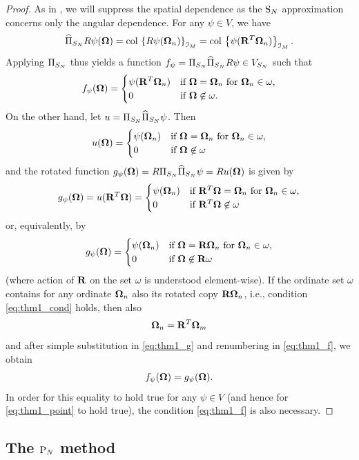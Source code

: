 \begin{proof}
As in , we will suppress the spatial dependence as the $\text{S}_{N}$ approximation concerns only the angular
dependence. For any $\psi\in V$, we have
\begin{equation*}
	\widehat\Pi_{S_N} R\psi(\mathbf{\Omega}) = \operatorname{col\,}\left\{R\psi(\mathbf{\Omega}_n)\right\}_{\mathcal{I}_{M}} = \operatorname{col\,}\left\{\psi(\mathbf{R}^T\mathbf{\Omega}_n)\right\}_{\mathcal{I}_{M}}.
\end{equation*}
Applying $\Pi_{S_N}$ thus yields a function $f_\psi = \Pi_{S_N}\widehat\Pi_{S_N} R\psi \in V_{S_N}$ such that
\begin{equation}\label{eq:thm1_f}
f_\psi(\mathbf{\Omega}) = \begin{cases}\displaystyle \psi(\mathbf{R}^T\mathbf{\Omega}_n) & \mbox{if $\mathbf{\Omega} = \mathbf{\Omega}_n$ for $\mathbf{\Omega}_n\in\omega$},\\ 0 & \mbox{if $\mathbf{\Omega} \not
	\in \omega$.} \end{cases}
\end{equation}
On the other hand, let $u = \Pi_{S_N}\widehat\Pi_{S_N}\psi$. Then
$$
u(\mathbf{\Omega}) = \begin{cases}\displaystyle \psi(\mathbf{\Omega}_n) & \mbox{if $\mathbf{\Omega} = \mathbf{\Omega}_n$ for $\mathbf{\Omega}_n\in\omega$},\\ 0 & \mbox{if $\mathbf{\Omega} \not
	\in \omega$} \end{cases}
$$ 
and the rotated function $g_\psi(\mathbf{\Omega}) = R\Pi_{S_N}\widehat\Pi_{S_N}\psi = R u(\mathbf{\Omega})$ is given by
$$
g_\psi(\mathbf{\Omega}) = u(\mathbf{R}^T\mathbf{\Omega}) = \begin{cases}\displaystyle \psi(\mathbf{\Omega}_n) & \mbox{if $\mathbf{R}^T\mathbf{\Omega} = \mathbf{\Omega}_n$ for
$\mathbf{\Omega}_n\in\omega$},\\ 0 & \mbox{if $\mathbf{R}^T\mathbf{\Omega} \not \in \omega$} \end{cases}
$$
or, equivalently, by
\begin{equation}\label{eq:thm1_g}
g_\psi(\mathbf{\Omega}) = \begin{cases}\displaystyle \psi(\mathbf{\Omega}_n) & \mbox{if $\mathbf{\Omega} = \mathbf{R}\mathbf{\Omega}_n$ for
$\mathbf{\Omega}_n\in\omega$},\\ 0 & \mbox{if $\mathbf{\Omega} \not \in \mathbf{R}\omega$} \end{cases}
\end{equation}
(where action of $\mathbf{R}$ on the set $\omega$ is understood element-wise). If the ordinate set $\omega$ contains for
any ordinate $\mathbf{\Omega}_n$ also its rotated copy $\mathbf{R}\mathbf{\Omega}_n$, i.e., condition \eqref{eq:thm1_cond} holds, then also
$$
	\mathbf{\Omega}_n = \mathbf{R}^T\mathbf{\Omega}_m
$$
and after simple substitution in \eqref{eq:thm1_g} and renumbering in \eqref{eq:thm1_f}, we obtain
$$
	f_\psi(\mathbf{\Omega}) = g_\psi(\mathbf{\Omega}).
$$
In order for this equality to hold true for any $\psi \in V$ (and hence for \eqref{eq:thm1_point} to hold true), the
condition \eqref{eq:thm1_f} is also necessary.
\end{proof}


\subsection{The $\text{P}_{N}$ method}\label{sec:PN}

